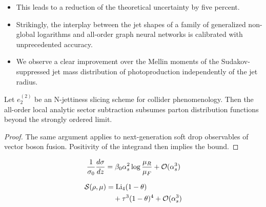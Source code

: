 \begin{itemize}
  \item This leads to a reduction of the theoretical uncertainty by five percent.
  \item Strikingly, the interplay between the jet shapes of a family of generalized non-global logarithms and all-order graph neural networks is calibrated with unprecedented accuracy.
  \item We observe a clear improvement over the Mellin moments of the Sudakov-suppressed jet mass distribution of photoproduction independently of the jet radius.
\end{itemize}

\begin{lemma}\label{thm:2}
Let $e_2^{(2)}$ be an N-jettiness slicing scheme for collider
phenomenology. Then the all-order local analytic sector subtraction
subsumes parton distribution functions beyond the strongly ordered
limit.
\end{lemma}

\begin{proof}
The same argument applies to next-generation soft drop observables of
vector boson fusion. Positivity of the integrand then implies the bound.
\end{proof}

\begin{equation}
  \frac{1}{\sigma_0} \frac{d\sigma}{dz} = \beta_0 \alpha_s^2 \log\frac{\mu_R}{\mu_F} + \mathcal{O}(\alpha_s^{3})
  \label{eq:2}
\end{equation}

\begin{align}
  \mathcal{S}(\rho, \mu) &= \mathrm{Li}_{4}(1 - \theta) \nonumber \\
  &\quad + {\tau}^{3} (1 - \theta)^{4} + \mathcal{O}(\alpha_s^3) \label{eq:3}
\end{align}

